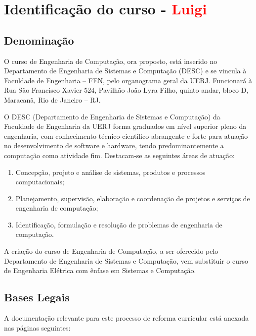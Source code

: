 \chapter{Identificação do curso - \textcolor{red}{Luigi}}

\section{Denominação}

O curso de Engenharia de Computação, ora proposto, está inserido no Departamento de Engenharia de Sistemas e Computação (DESC) e se vincula à Faculdade de Engenharia – FEN, pelo organograma geral da UERJ. Funcionará à Rua São Francisco Xavier 524, Pavilhão João Lyra Filho, quinto andar, bloco D, Maracanã, Rio de Janeiro – RJ.

O DESC (Departamento de Engenharia de Sistemas e Computação) da Faculdade de Engenharia da UERJ forma graduados em nível superior pleno da engenharia, com conhecimento técnico-científico abrangente e forte para atuação no desenvolvimento de software e hardware, tendo predominantemente a computação como atividade fim. Destacam-se as seguintes áreas de atuação:

\begin{enumerate}
	\item Concepção, projeto e análise de sistemas, produtos e processos computacionais;
	\item Planejamento, supervisão, elaboração e coordenação de projetos e serviços de engenharia de computação;
	\item Identificação, formulação e resolução de problemas de engenharia de computação.
\end{enumerate}

A criação do curso de Engenharia de Computação, a ser oferecido pelo Departamento de Engenharia de Sistemas e Computação, vem substituir o curso de Engenharia Elétrica com ênfase em Sistemas e Computação.

\section{Bases Legais}

A documentação relevante para este processo de reforma curricular está anexada nas páginas seguintes:

